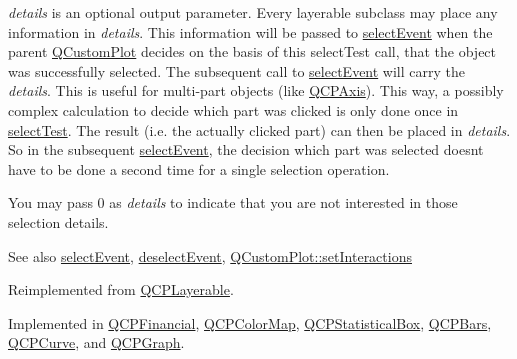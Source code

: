 {\itshape details} is an optional output parameter. Every layerable subclass may place any information in {\itshape details}. This information will be passed to \hyperlink{class_q_c_p_abstract_plottable_a16aaad02456aa23a759efd1ac90c79bf}{select\+Event} when the parent \hyperlink{class_q_custom_plot}{Q\+Custom\+Plot} decides on the basis of this select\+Test call, that the object was successfully selected. The subsequent call to \hyperlink{class_q_c_p_abstract_plottable_a16aaad02456aa23a759efd1ac90c79bf}{select\+Event} will carry the {\itshape details}. This is useful for multi-\/part objects (like \hyperlink{class_q_c_p_axis}{Q\+C\+P\+Axis}). This way, a possibly complex calculation to decide which part was clicked is only done once in \hyperlink{class_q_c_p_abstract_plottable_a38efe9641d972992a3d44204bc80ec1d}{select\+Test}. The result (i.\+e. the actually clicked part) can then be placed in {\itshape details}. So in the subsequent \hyperlink{class_q_c_p_abstract_plottable_a16aaad02456aa23a759efd1ac90c79bf}{select\+Event}, the decision which part was selected doesn\textquotesingle{}t have to be done a second time for a single selection operation.

You may pass 0 as {\itshape details} to indicate that you are not interested in those selection details.

\begin{DoxySeeAlso}{See also}
\hyperlink{class_q_c_p_abstract_plottable_a16aaad02456aa23a759efd1ac90c79bf}{select\+Event}, \hyperlink{class_q_c_p_abstract_plottable_a6fa0d0f95560ea8b01ee13f296dab2b1}{deselect\+Event}, \hyperlink{class_q_custom_plot_a5ee1e2f6ae27419deca53e75907c27e5}{Q\+Custom\+Plot\+::set\+Interactions} 
\end{DoxySeeAlso}


Reimplemented from \hyperlink{class_q_c_p_layerable_a4001c4d0dfec55598efa4d531f2179a9}{Q\+C\+P\+Layerable}.



Implemented in \hyperlink{class_q_c_p_financial_adf6cff00a55f775487d375fe4df5e95b}{Q\+C\+P\+Financial}, \hyperlink{class_q_c_p_color_map_a4088dc7bcbe9bba605c84a912ba660ff}{Q\+C\+P\+Color\+Map}, \hyperlink{class_q_c_p_statistical_box_a7d3ac843dc48a085740fdfc4319a89cc}{Q\+C\+P\+Statistical\+Box}, \hyperlink{class_q_c_p_bars_a0d37a9feb1d0baf73ce6e809db214445}{Q\+C\+P\+Bars}, \hyperlink{class_q_c_p_curve_a5af9949e725704811bbc81ecd5970b8e}{Q\+C\+P\+Curve}, and \hyperlink{class_q_c_p_graph_abc9ff375aabcf2d21cca33d6baf85772}{Q\+C\+P\+Graph}.



